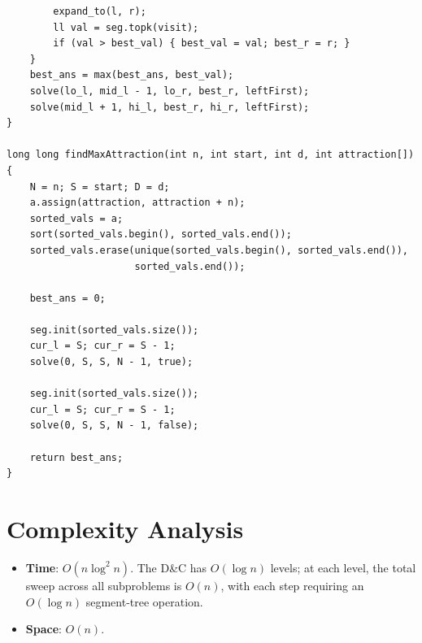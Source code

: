 \documentclass[11pt,a4paper]{article}
\begin{document}
\begin{lstlisting}
        expand_to(l, r);
        ll val = seg.topk(visit);
        if (val > best_val) { best_val = val; best_r = r; }
    }
    best_ans = max(best_ans, best_val);
    solve(lo_l, mid_l - 1, lo_r, best_r, leftFirst);
    solve(mid_l + 1, hi_l, best_r, hi_r, leftFirst);
}

long long findMaxAttraction(int n, int start, int d, int attraction[]) {
    N = n; S = start; D = d;
    a.assign(attraction, attraction + n);
    sorted_vals = a;
    sort(sorted_vals.begin(), sorted_vals.end());
    sorted_vals.erase(unique(sorted_vals.begin(), sorted_vals.end()),
                      sorted_vals.end());

    best_ans = 0;

    seg.init(sorted_vals.size());
    cur_l = S; cur_r = S - 1;
    solve(0, S, S, N - 1, true);

    seg.init(sorted_vals.size());
    cur_l = S; cur_r = S - 1;
    solve(0, S, S, N - 1, false);

    return best_ans;
}
\end{lstlisting}

\section{Complexity Analysis}

\begin{itemize}
  \item \textbf{Time}: $O(n \log^2 n)$. The D\&C has $O(\log n)$ levels; at each level, the total sweep across all subproblems is $O(n)$, with each step requiring an $O(\log n)$ segment-tree operation.
  \item \textbf{Space}: $O(n)$.
\end{itemize}
\end{document}

